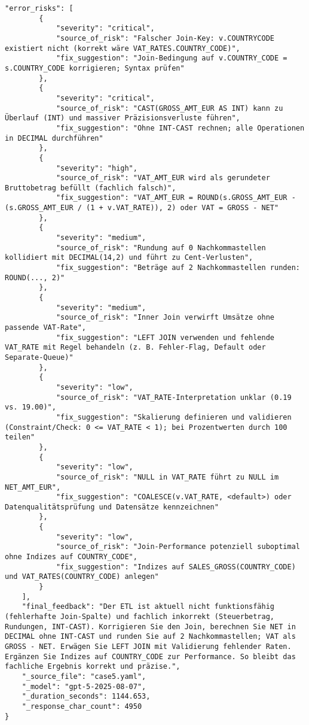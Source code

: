 \begin{lstlisting}[caption={Ausgabe: GPT-5 Anwendungsfall 5 Konsistenzdurchlauf},label={gpt_case5_prompt2}]
    "error_risks": [
        {
            "severity": "critical",
            "source_of_risk": "Falscher Join-Key: v.COUNTRYCODE existiert nicht (korrekt wäre VAT_RATES.COUNTRY_CODE)",
            "fix_suggestion": "Join-Bedingung auf v.COUNTRY_CODE = s.COUNTRY_CODE korrigieren; Syntax prüfen"
        },
        {
            "severity": "critical",
            "source_of_risk": "CAST(GROSS_AMT_EUR AS INT) kann zu Überlauf (INT) und massiver Präzisionsverluste führen",
            "fix_suggestion": "Ohne INT-CAST rechnen; alle Operationen in DECIMAL durchführen"
        },
        {
            "severity": "high",
            "source_of_risk": "VAT_AMT_EUR wird als gerundeter Bruttobetrag befüllt (fachlich falsch)",
            "fix_suggestion": "VAT_AMT_EUR = ROUND(s.GROSS_AMT_EUR - (s.GROSS_AMT_EUR / (1 + v.VAT_RATE)), 2) oder VAT = GROSS - NET"
        },
        {
            "severity": "medium",
            "source_of_risk": "Rundung auf 0 Nachkommastellen kollidiert mit DECIMAL(14,2) und führt zu Cent-Verlusten",
            "fix_suggestion": "Beträge auf 2 Nachkommastellen runden: ROUND(..., 2)"
        },
        {
            "severity": "medium",
            "source_of_risk": "Inner Join verwirft Umsätze ohne passende VAT-Rate",
            "fix_suggestion": "LEFT JOIN verwenden und fehlende VAT_RATE mit Regel behandeln (z. B. Fehler-Flag, Default oder Separate-Queue)"
        },
        {
            "severity": "low",
            "source_of_risk": "VAT_RATE-Interpretation unklar (0.19 vs. 19.00)",
            "fix_suggestion": "Skalierung definieren und validieren (Constraint/Check: 0 <= VAT_RATE < 1); bei Prozentwerten durch 100 teilen"
        },
        {
            "severity": "low",
            "source_of_risk": "NULL in VAT_RATE führt zu NULL im NET_AMT_EUR",
            "fix_suggestion": "COALESCE(v.VAT_RATE, <default>) oder Datenqualitätsprüfung und Datensätze kennzeichnen"
        },
        {
            "severity": "low",
            "source_of_risk": "Join-Performance potenziell suboptimal ohne Indizes auf COUNTRY_CODE",
            "fix_suggestion": "Indizes auf SALES_GROSS(COUNTRY_CODE) und VAT_RATES(COUNTRY_CODE) anlegen"
        }
    ],
    "final_feedback": "Der ETL ist aktuell nicht funktionsfähig (fehlerhafte Join-Spalte) und fachlich inkorrekt (Steuerbetrag, Rundungen, INT-CAST). Korrigieren Sie den Join, berechnen Sie NET in DECIMAL ohne INT-CAST und runden Sie auf 2 Nachkommastellen; VAT als GROSS - NET. Erwägen Sie LEFT JOIN mit Validierung fehlender Raten. Ergänzen Sie Indizes auf COUNTRY_CODE zur Performance. So bleibt das fachliche Ergebnis korrekt und präzise.",
    "_source_file": "case5.yaml",
    "_model": "gpt-5-2025-08-07",
    "_duration_seconds": 1144.653,
    "_response_char_count": 4950
}
\end{lstlisting}

